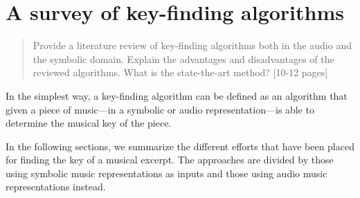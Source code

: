 
\chapter{A survey of key-finding algorithms}
\label{chap:chap3}

\begin{quote}
    Provide a literature review of key-finding algorithms both in the audio and the symbolic domain. Explain the advantages and disadvantages of the reviewed algorithms. What is the state-the-art method? [10-12 pages]
\end{quote}
\clearpage



In the simplest way, a key-finding algorithm can be defined as an algorithm that given a piece of music---in a symbolic or audio representation---is able to determine the musical key of the piece.

In the following sections, we summarize the different efforts that have been placed for finding the key of a musical excerpt. The approaches are divided by those using symbolic music representations as inputs and those using audio music representations instead.



